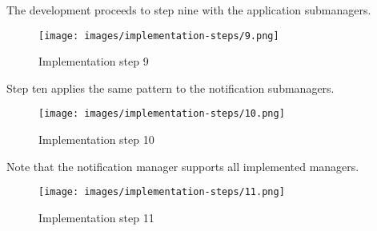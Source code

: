 \clearpage
The development proceeds to step nine with the application submanagers.

\begin{figure}[h]
    \centering
    \texttt{[image: images/implementation-steps/9.png]}
    \caption{Implementation step 9}
\end{figure}

Step ten applies the same pattern to the notification submanagers.

\begin{figure}[h]
    \centering
    \texttt{[image: images/implementation-steps/10.png]}
    \caption{Implementation step 10}
\end{figure}

\clearpage
Note that the notification manager supports all implemented managers.

\begin{figure}[h]
    \centering
    \texttt{[image: images/implementation-steps/11.png]}
    \caption{Implementation step 11}
\end{figure}
